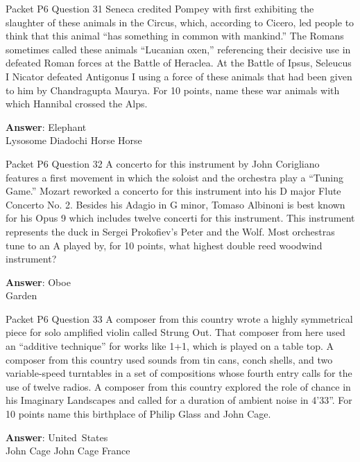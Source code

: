 \begin{frame}{Packet P6 Question 31}
Seneca credited Pompey   with first exhibiting the slaughter of these animals in the Circus, which, according to Cicero, led people to think that this animal “has something in common with mankind.” The Romans sometimes called these animals ``Lucanian oxen,'' referencing   their decisive use in defeated Roman forces at the Battle of Heraclea. At the Battle of Ipsus, Seleucus I Nicator defeated Antigonus I using a force of these animals that had been given to him by Chandragupta Maurya. For 10 points, name   these war animals with which Hannibal crossed the Alps.    

\textbf{Answer}: Elephant\\
 Lysosome
 Diadochi
 Horse
 Horse
\end{frame}

\begin{frame}{Packet P6 Question 32}
A concerto for this instrument   by John Corigliano features a first movement in which the soloist and the orchestra play a “Tuning Game.” Mozart reworked a concerto for this instrument   into his D major Flute Concerto No. 2.   Besides his Adagio in G minor, Tomaso Albinoni is best known for his Opus 9 which includes twelve concerti for this instrument. This instrument represents the duck in Sergei Prokofiev's   Peter and the Wolf. Most orchestras   tune to an A played by, for 10 points, what highest double reed woodwind instrument?

\textbf{Answer}: Oboe\\
 Garden
\end{frame}

\begin{frame}{Packet P6 Question 33}
A composer from this country wrote a highly symmetrical piece   for solo amplified violin called Strung Out. That composer from here used an ``additive technique'' for works like 1+1, which is played on a table top. A composer from this country used sounds from tin cans, conch shells, and two variable-speed turntables in a set of compositions whose fourth entry calls   for the use of twelve radios. A composer from this country explored the role of chance in his Imaginary Landscapes and called for a duration of ambient noise   in 4'33''. For 10   points name this birthplace of Philip Glass and John Cage.  

\textbf{Answer}: United\ States\\
 John Cage
 John Cage
 France
\end{frame}

